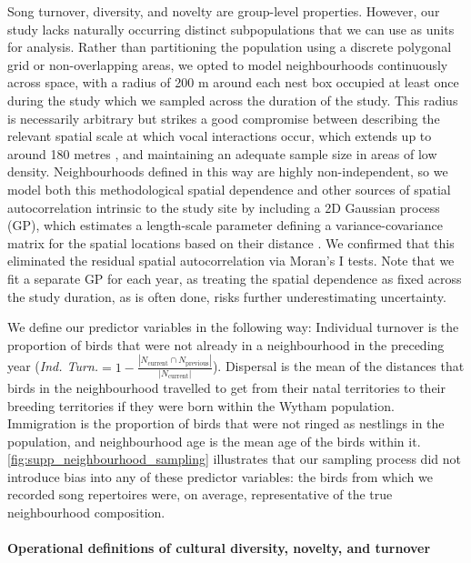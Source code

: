 Song turnover, diversity, and novelty are group-level properties. However, our study lacks naturally occurring distinct subpopulations that we can use as units for analysis. Rather than partitioning the population using a discrete polygonal grid or non-overlapping areas, we opted to model neighbourhoods continuously across space, with a radius of 200 m around each nest box occupied at least once during the study \parencite{fayet2014} which we sampled across the duration of the study. This radius is necessarily arbitrary but strikes a good compromise between describing the relevant spatial scale at which vocal interactions occur, which extends up to around 180 metres \parencite{bircher2021, blumenrath2004}, and maintaining an adequate sample size in areas of low density. Neighbourhoods defined in this way are highly non-independent, so we model both this methodological spatial dependence and other sources of spatial autocorrelation intrinsic to the study site by including a 2D Gaussian process (GP), which estimates a length-scale parameter defining a variance-covariance matrix for the spatial locations based on their distance \parencite{dearmon2016, gelfand2016, wright2021}. We confirmed that this eliminated the residual spatial autocorrelation via Moran's I tests. Note that we fit a separate GP for each year, as treating the spatial dependence as fixed across the study duration, as is often done, risks further underestimating uncertainty. 

We define our predictor variables in the following way: Individual turnover is the proportion of birds that were not already in a neighbourhood in the preceding year (\textit{Ind. Turn.}$ = 1 - \frac{|N_{\text{current}} \cap N_{\text{previous}}|}{|N_{\text{current}}|}$). Dispersal is the mean of the distances that birds in the neighbourhood travelled to get from their natal territories to their breeding territories if they were born within the Wytham population. Immigration is the proportion of birds that were not ringed as nestlings in the population, and neighbourhood age is the mean age of the birds within it. \autoref{fig:supp_neighbourhood_sampling} illustrates that our sampling process did not introduce bias into any of these predictor variables: the birds from which we recorded song repertoires were, on average, representative of the true neighbourhood composition.

\paragraph{Operational definitions of cultural diversity, novelty, and turnover}

